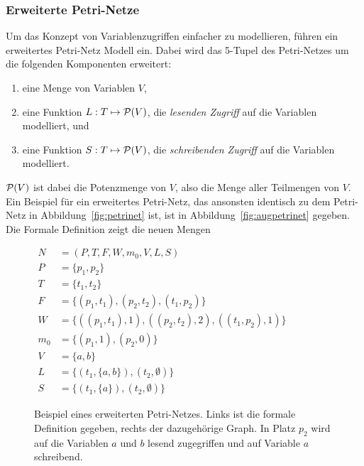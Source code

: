 \subsubsection{Erweiterte Petri-Netze}
Um das Konzept von Variablenzugriffen einfacher zu modellieren, führen \textcite{Goel1990} ein erweitertes Petri-Netz Modell ein. Dabei wird das 5-Tupel des Petri-Netzes um die folgenden Komponenten erweitert:
\begin{enumerate}
	\item eine Menge von Variablen $V$,
	\item eine Funktion $L: T \mapsto \mathcal{P}(V)$, die \emph{lesenden Zugriff} auf die Variablen modelliert, und
	\item eine Funktion $S: T \mapsto \mathcal{P}(V)$, die \emph{schreibenden Zugriff} auf die Variablen modelliert.
\end{enumerate}
$\mathcal{P}(V)$ ist dabei die Potenzmenge von $V$, also die Menge aller Teilmengen von $V$.
Ein Beispiel für ein erweitertes Petri-Netz, das ansonsten identisch zu dem Petri-Netz in Abbildung~\vref{fig:petrinet} ist, ist in Abbildung~\vref{fig:augpetrinet} gegeben. Die Formale Definition zeigt die neuen Mengen 
\begin{figure}
\centering
	\begin{minipage}[c]{.49\textwidth}
		$\begin{aligned}
			N &= (P,T,F,W,m_0, V, L, S)\\
			P &= \{p_1, p_2\}\\
			T &= \{t_1, t_2\}\\
			F &= \{(p_1, t_1), (p_2, t_2), (t_1, p_2)\}\\
			W &= \{((p_1, t_1),1), ((p_2, t_2),2), ((t_1, p_2), 1)\}\\
			m_0 &= \{(p_1, 1), (p_2, 0)\}\\
			V &= \{a,b\}\\
			L &= \{(t_1,\{a,b\}), (t_2,\emptyset)\}\\
			S &= \{(t_1,\{a\}), (t_2,\emptyset)\}
		\end{aligned}$
	\end{minipage}
	\hfill
	\begin{minipage}[c]{.49\textwidth}
	\end{minipage}
	\caption[Beispiel eines erweiterten Petri-Netzes.]{Beispiel eines erweiterten Petri-Netzes. Links ist die formale Definition gegeben, rechts der dazugehörige Graph. In Platz $p_2$ wird auf die Variablen $a$ und $b$ lesend zugegriffen und auf Variable $a$ schreibend.}\label{fig:augpetrinet}
\end{figure}